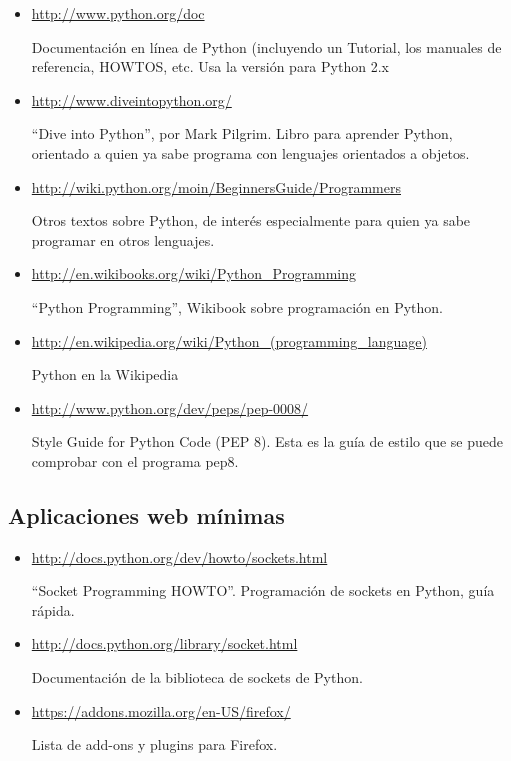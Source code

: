 \begin{itemize}
\item \url{http://www.python.org/doc}

Documentación en línea de Python (incluyendo un Tutorial, los manuales de referencia, HOWTOS, etc. Usa la versión para Python 2.x

\item \url{http://www.diveintopython.org/}

``Dive into Python'', por Mark Pilgrim. Libro para aprender Python, orientado a quien ya sabe programa con lenguajes orientados a objetos.

\item \url{http://wiki.python.org/moin/BeginnersGuide/Programmers}

Otros textos sobre Python, de interés especialmente para quien ya sabe programar en otros lenguajes.

\item \url{http://en.wikibooks.org/wiki/Python_Programming}

``Python Programming'', Wikibook sobre programación en Python.

\item \url{http://en.wikipedia.org/wiki/Python_(programming_language)}

Python en la Wikipedia

\item \url{http://www.python.org/dev/peps/pep-0008/}

Style Guide for Python Code (PEP 8). Esta es la guía de estilo que se puede comprobar con el programa pep8.
\end{itemize}

\subsection{Aplicaciones web mínimas}

\begin{itemize}
\item \url{http://docs.python.org/dev/howto/sockets.html}

``Socket Programming HOWTO''. Programación de sockets en Python, guía rápida.

\item \url{http://docs.python.org/library/socket.html}

Documentación de la biblioteca de sockets de Python.

\item \url{https://addons.mozilla.org/en-US/firefox/} 

Lista de add-ons y plugins para Firefox.

\end{itemize}

